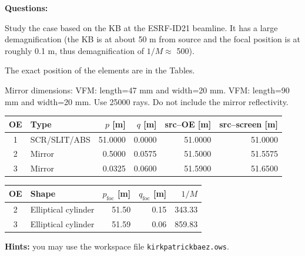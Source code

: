 \begin{questionsbox}
\textbf{Questions:}

Study the case based on the KB at the ESRF-ID21 beamline.
It has a large demagnification (the KB is at about 50 m from source and the focal position is at roughly 0.1 m, thus demagnification of $1/M\approx$ 500).

The exact position of the elements are in the Tables.

Mirror dimensions: VFM: length=47 mm and width=20 mm. VFM: length=90 mm and width=20 mm. Use 25000 rays. Do not include the mirror reflectivity.

\begin{center}
\begin{tabular}{clrrrr}
    \hline
    OE & Type & $p$ [m] & $q$ [m] & src--OE [m] & src--screen [m] \\
    \hline
    1 & SCR/SLIT/ABS &  51.0000 & 0.0000 & 51.0000 & 51.0000 \\
    2 & Mirror       &   0.5000 & 0.0575 & 51.5000 & 51.5575 \\
    3 & Mirror       &   0.0325 & 0.0600 & 51.5900 & 51.6500 \\
    \hline
\end{tabular}
\end{center}

\begin{center}
\begin{tabular}{clrrr}
    \hline
    OE & Shape & $p_\mathrm{foc}$ [m] & $q_\mathrm{foc}$ [m] & $1/M$ \\
    \hline
    2 & Elliptical cylinder & 51.50 & 0.15 & 343.33 \\
    3 & Elliptical cylinder & 51.59 & 0.06 & 859.83 \\
    \hline
\end{tabular}
\end{center}
\end{questionsbox}

\begin{hintsbox}
\textbf{Hints:} you may use the workspace file {\tt kirkpatrickbaez.ows}.
\end{hintsbox}

